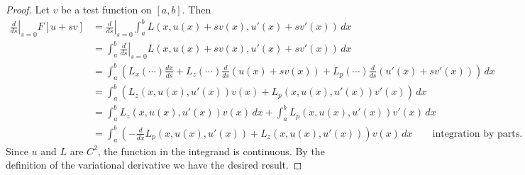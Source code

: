 \documentclass[11pt]{article}
\begin{document}
\begin{proof}
Let $v$ be a test function on $[a,b]$. Then
\begin{align*}
\left. \frac{d}{ds} \right|_{s=0} F[u + sv] &= \left. \frac{d}{ds} \right|_{s=0} \int_a^b L(x, u(x) + sv(x), u'(x) + sv'(x)) \, dx \\
&=  \int_a^b \left. \frac{d}{ds} \right|_{s=0} L(x, u(x) + sv(x), u'(x) + sv'(x)) \, dx \\
&= \int_a^b \left( L_x(\cdots) \frac{dx}{ds} + L_z(\cdots)\frac{d}{ds}(u(x) + sv(x)) + L_p(\cdots)\frac{d}{ds}(u'(x) + sv'(x)) \right) \, dx \\
&= \int_a^b \left( L_z(x,u(x),u'(x))v(x) + L_p(x,u(x),u'(x))v'(x) \right)\, dx \\
&= \int_a^b L_z(x,u(x),u'(x))v(x) \, dx + \int_a^b L_p(x,u(x),u'(x))v'(x) \, dx \\
&= \int_a^b \left( -\frac{d}{dx} L_p(x,u(x),u'(x)) + L_z(x,u(x),u'(x)) \right) v(x) \, dx \qquad \text{integration by parts.}
\end{align*}
Since $u$ and $L$ are $C^2$, the function in the integrand is continuous. By the definition of the variational derivative we have the desired result.
\end{proof}
\end{document}
